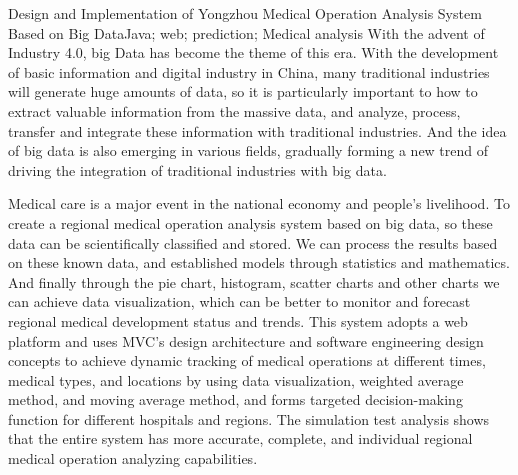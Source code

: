 \documentclass{husethesis}
\begin{document}
\begin{enabstract}{Design and Implementation of Yongzhou Medical Operation Analysis System Based on Big Data}{Java; web; prediction; Medical analysis}
With the advent of Industry 4.0, big Data has become the theme of this era. With the development of basic information and digital industry in China, many traditional industries will generate huge amounts of data, so it is particularly important to how to extract valuable information from the massive data, and analyze, process, transfer and integrate these information with traditional industries. And the idea of big data is also emerging in various fields, gradually forming a new trend of driving the integration of traditional industries with big data.

\begin{sloppypar}%
Medical care is a major event in the national economy and people's livelihood. To create a regional medical operation analysis system based on big data, so these data can be scientifically classified and stored. We can process the results based on these known data, and established models through statistics and mathematics. And finally through the pie chart, histogram, scatter charts and other charts we can achieve data visualization, which can be better to monitor and forecast regional medical development status and trends. This system adopts a web platform and uses MVC's design architecture and software engineering design concepts to achieve dynamic tracking of medical operations at different times, medical types, and locations by using data visualization, weighted average method, and moving average method, and forms targeted decision-making function for different hospitals and regions. The simulation test analysis shows that the entire system has more accurate, complete, and individual regional medical operation analyzing capabilities.
\end{sloppypar}

\end{enabstract}

\startmainbody
\end{document}
